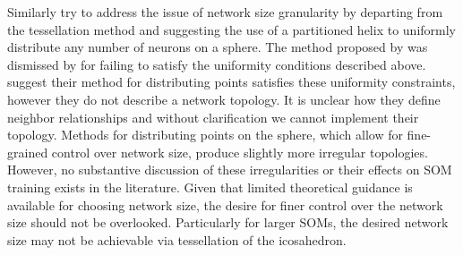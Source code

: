 Similarly \cite{Nishio:2006fk} try to address the issue of network size
granularity by departing from the tessellation method and suggesting the use
of a partitioned helix to uniformly distribute any number of neurons on a
sphere.  The method proposed by \cite{Rakhmanov94} was dismissed by
\cite{wu2005} for failing to satisfy the uniformity conditions described
above. \cite{Nishio:2006fk} suggest their method for distributing points
satisfies these uniformity constraints, however they do not describe a network
topology.  It is unclear how they define neighbor relationships and without
clarification we cannot implement their topology.  Methods for distributing
points on the sphere, which allow for fine-grained control over network size,
produce slightly more irregular topologies.  However, no substantive
discussion of these irregularities or their effects on SOM training exists in
the literature. Given that limited theoretical guidance is available for
choosing network size, the desire for finer control over the network size
should not be overlooked. Particularly for larger SOMs, the desired network
size may not be achievable via tessellation of the icosahedron.

